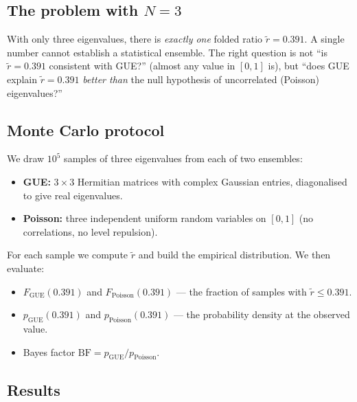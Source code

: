 \documentclass[11pt,a4paper]{article}
\theoremstyle{plain}
\theoremstyle{definition}
\theoremstyle{remark}
\begin{document}
\subsection{The problem with $N=3$}

With only three eigenvalues, there is \emph{exactly one} folded ratio
$\tilde r = 0.391$.  A single number cannot establish a statistical
ensemble.  The right question is not ``is $\tilde r = 0.391$ consistent
with GUE?'' (almost any value in $[0,1]$ is), but ``does GUE explain
$\tilde r = 0.391$ \emph{better than} the null hypothesis of
uncorrelated (Poisson) eigenvalues?''

\subsection{Monte Carlo protocol}

We draw $10^5$ samples of three eigenvalues from each of two ensembles:
\begin{itemize}[leftmargin=1.4em,itemsep=1pt]
  \item \textbf{GUE:} $3\times 3$ Hermitian matrices with complex
        Gaussian entries, diagonalised to give real eigenvalues.
  \item \textbf{Poisson:} three independent uniform random variables
        on $[0,1]$ (no correlations, no level repulsion).
\end{itemize}
For each sample we compute $\tilde r$ and build the empirical
distribution.  We then evaluate:
\begin{itemize}[leftmargin=1.4em,itemsep=1pt]
  \item $F_{\mathrm{GUE}}(0.391)$ and $F_{\mathrm{Poisson}}(0.391)$ ---
        the fraction of samples with $\tilde r \le 0.391$.
  \item $p_{\mathrm{GUE}}(0.391)$ and $p_{\mathrm{Poisson}}(0.391)$ ---
        the probability density at the observed value.
  \item Bayes factor $\mathrm{BF} = p_{\mathrm{GUE}} / p_{\mathrm{Poisson}}$.
\end{itemize}

\subsection{Results}
\end{document}
